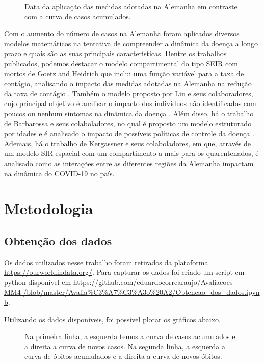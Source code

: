 \documentclass[12pt]{article}
\begin{document}
\begin{figure}[h!]
    \label{graphmedidas}
    \centering
    
    \caption{Data da aplicação das medidas adotadas na Alemanha em contraste com a curva de casos acumulados.}
\end{figure}

Com o aumento do número de casos na Alemanha foram aplicados diversos modelos matemáticos na tentativa de compreender a dinâmica da doença a longo prazo e quais são as suas principais características. Dentre os trabalhos publicados, podemos destacar o modelo  compartimental do tipo SEIR com mortos de Goetz and Heidrich que inclui uma função variável para a taxa de contágio, analisando o impacto das medidas adotadas na Alemanha na redução da taxa de contágio \cite{goetz2020covid}. Também o modelo proposto por Liu e seus colaboradores, cujo principal objetivo é analisar o impacto dos indivíduos não identificados com poucos ou nenhum sintomas na dinâmica da doença \cite{liu2020predicting}. Além disso, há o trabalho de Barbarossa e seus colaboladores, no qual é proposto um modelo estruturado por idades e é analisado o impacto de possíveis políticas de controle da doença \cite{barbarossa2020modeling}. Ademais, há o trabalho de Kergassner e seus colaboladores, em que, através de um modelo SIR espacial com um compartimento a mais para os quarentenados, é analisado como as interações entre as diferentes regiões da Alemanha impactam na dinâmica do COVID-19 no país.
 
\section{Metodologia}
\subsection{Obtenção dos dados}

Os dados utilizados nesse trabalho foram retirados da plataforma \url{https://ourworldindata.org/}. Para capturar os dados foi criado um script em python disponível em \url{https://github.com/eduardocorrearaujo/Avaliacoes-MM4-/blob/master/Avalia\%C3\%A7\%C3\%A3o\%20A2/Obtencao_dos_dados.ipynb}.

Utilizando os dados disponíveis, foi possível plotar os gráficos abaixo. 

\begin{figure}[h!]
    \centering
    
    \caption{Na primeira linha, a esquerda temos a curva de casos acumulados e a direita a curva de novos casos. Na segunda linha, a esquerda a curva de óbitos acumulados e a direita a curva de novos óbitos.}
    \label{fig:my_label}
\end{figure}
\end{document}
